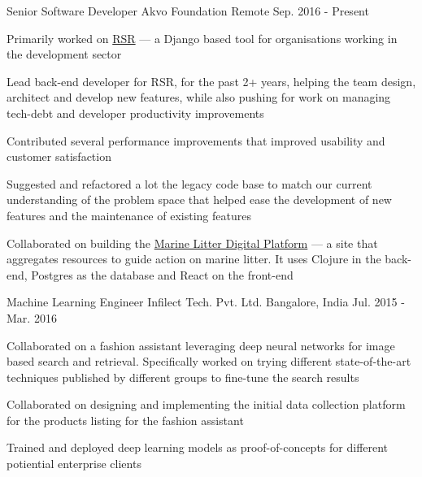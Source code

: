 

\begin{cventries}

  \cventry
      {Senior Software Developer} %
      {Akvo Foundation } %
      {Remote} %
      {Sep. 2016 - Present} %
      {
        \begin{cvitems} %
        \item {Primarily worked on \href{https://github.com/akvo/akvo-rsr}{RSR} --- a Django based tool for organisations working in the development sector}
        \item {Lead back-end developer for RSR, for the past 2+ years, helping the team design, architect and develop new features, while also pushing for work on managing tech-debt and developer productivity improvements}
        \item {Contributed several performance improvements that improved usability and customer satisfaction}
        \item {Suggested and refactored a lot the legacy code base to match our current understanding of the problem space that helped ease the development of new features and the maintenance of existing features}
        \item {Collaborated on building the \href{https://digital.gpmarinelitter.org/}{Marine Litter Digital Platform} --- a site that aggregates resources to guide action on marine litter. It uses Clojure in the back-end, Postgres as the database and React on the front-end}
        \end{cvitems}
      }

  \cventry
    {Machine Learning Engineer} %
    {Infilect Tech. Pvt. Ltd. } %
    {Bangalore, India} %
    {Jul. 2015 - Mar. 2016} %
    {
      \begin{cvitems} %
        \item{Collaborated on a fashion assistant leveraging deep neural networks for image based search and retrieval. Specifically worked on trying different state-of-the-art techniques published by different groups to fine-tune the search results}
        \item{Collaborated on designing and implementing the initial data collection platform for the products listing for the fashion assistant}
        \item{Trained and deployed deep learning models as proof-of-concepts for different potiential enterprise clients}
      \end{cvitems}
    }


\end{cventries}
